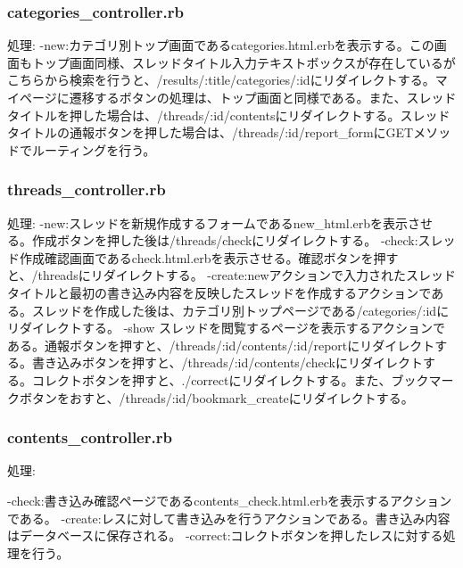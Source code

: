 \documentclass[a4j]{jarticle}
\begin{document}
\subsubsection{categories\_controller.rb}
処理:\newline
-new:カテゴリ別トップ画面であるcategories.html.erbを表示する。この画面もトップ画面同様、スレッドタイトル入力テキストボックスが存在しているがこちらから検索を行うと、/results/:title/categories/:idにリダイレクトする。マイページに遷移するボタンの処理は、トップ画面と同様である。また、スレッドタイトルを押した場合は、/threads/:id/contentsにリダイレクトする。スレッドタイトルの通報ボタンを押した場合は、/threads/:id/report\_formにGETメソッドでルーティングを行う。\newline

\subsubsection{threads\_controller.rb}
処理:\newline
-new:スレッドを新規作成するフォームであるnew\_html.erbを表示させる。作成ボタンを押した後は/threads/checkにリダイレクトする。\newline
-check:スレッド作成確認画面であるcheck.html.erbを表示させる。確認ボタンを押すと、/threadsにリダイレクトする。\newline
-create:newアクションで入力されたスレッドタイトルと最初の書き込み内容を反映したスレッドを作成するアクションである。スレッドを作成した後は、カテゴリ別トップページである/categories/:idにリダイレクトする。
-show スレッドを閲覧するページを表示するアクションである。通報ボタンを押すと、/threads/:id/contents/:id/reportにリダイレクトする。書き込みボタンを押すと、/threads/:id/contents/checkにリダイレクトする。コレクトボタンを押すと、./correctにリダイレクトする。また、ブックマークボタンをおすと、/threads/:id/bookmark\_createにリダイレクトする。\newline

\subsubsection{contents\_controller.rb}
処理:\newline

-check:書き込み確認ページであるcontents\_check.html.erbを表示するアクションである。\newline
-create:レスに対して書き込みを行うアクションである。書き込み内容はデータベースに保存される。\newline
-correct:コレクトボタンを押したレスに対する処理を行う。
\end{document}
